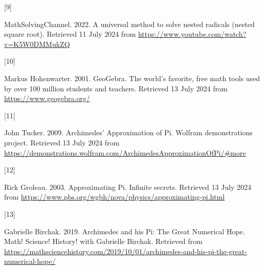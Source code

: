 \documentclass[
  a4paper,
]{article}
\newlength{\cslhangindent}
\newlength{\csllabelwidth}
\newenvironment{CSLReferences}[2] %
 {\begin{list}{}{%
  \setlength{\itemindent}{0pt}
  \setlength{\leftmargin}{0pt}
  \setlength{\parsep}{0pt}
  \ifodd #1
   \setlength{\leftmargin}{\cslhangindent}
   \setlength{\itemindent}{-1\cslhangindent}
  \fi
  \setlength{\itemsep}{#2\baselineskip}}}
 {\end{list}}
\newcommand{\CSLLeftMargin}[1]{\parbox[t]{\csllabelwidth}{\strut#1\strut}}
\newcommand{\CSLRightInline}[1]{\parbox[t]{\linewidth - \csllabelwidth}{\strut#1\strut}}
\begin{document}
\begin{CSLReferences}{0}{0}
\CSLLeftMargin{{[}9{]} }%
\CSLRightInline{MathSolvingChannel. 2022. A universal method to solve
nested radicals (nested square root). Retrieved 11 July 2024 from
\url{https://www.youtube.com/watch?v=K5W0DMMukZQ}}

\CSLLeftMargin{{[}10{]} }%
\CSLRightInline{Markus Hohenwarter. 2001. {GeoGebra}. {The world's
favorite, free math tools used by over 100 million students and
teachers}. Retrieved 13 July 2024 from \url{https://www.geogebra.org/}}

\CSLLeftMargin{{[}11{]} }%
\CSLRightInline{John Tucker. 2009. {Archimedes' Approximation of Pi}.
Wolfram demonstrations project. Retrieved 13 July 2024 from
\url{https://demonstrations.wolfram.com/ArchimedesApproximationOfPi/\#more}}

\CSLLeftMargin{{[}12{]} }%
\CSLRightInline{Rick Groleau. 2003. {Approximating Pi}. Infinite
secrets. Retrieved 13 July 2024 from
\url{https://www.pbs.org/wgbh/nova/physics/approximating-pi.html}}

\CSLLeftMargin{{[}13{]} }%
\CSLRightInline{Gabrielle Bir­chak. 2019. {Archimedes and his Pi: The
Great Numerical Hope}. {Math! Science! History! with Gabrielle Birchak}.
Retrieved from
\url{https://mathsciencehistory.com/2019/10/01/archimedes-and-his-pi-the-great-numerical-hope/}}

\end{CSLReferences}
\end{document}
